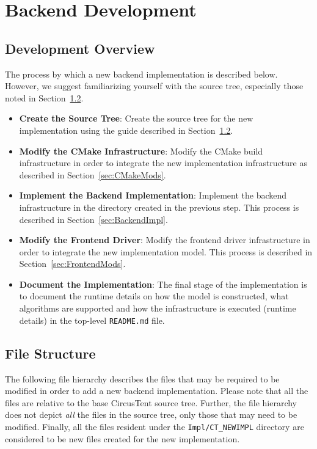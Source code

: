 \documentclass{article}
\begin{document}
\section{Backend Development}
\label{sec:BackendDev}

\subsection{Development Overview}
\label{sec:DevelopmentOverview}

The process by which a new backend implementation is described below.  However, 
we suggest familiarizing yourself with the source tree, especially those noted in 
Section~\ref{sec:FileStructure}.  

\begin{itemize}
\item \textbf{Create the Source Tree}: Create the source tree for the new implementation 
using the guide described in Section~\ref{sec:FileStructure}.  

\item \textbf{Modify the CMake Infrastructure}: Modify the CMake build infrastructure 
in order to integrate the new implementation infrastructure as described in Section~\ref{sec:CMakeMods}.  

\item \textbf{Implement the Backend Implementation}: Implement the backend infrastructure 
in the directory created in the previous step.  This process is described in Section~\ref{sec:BackendImpl}.  

\item \textbf{Modify the Frontend Driver}:  Modify the frontend driver infrastructure in order to 
integrate the new implementation model.  This process is described in Section~\ref{sec:FrontendMods}.  

\item \textbf{Document the Implementation}: The final stage of the implementation is to document the 
runtime details on how the model is constructed, what algorithms are supported and how the infrastructure 
is executed (runtime details) in the top-level \texttt{README.md} file.   
\end{itemize}

\clearpage
\subsection{File Structure}
\label{sec:FileStructure}

The following file hierarchy describes the files that may be required to be modified 
in order to add a new backend implementation.  Please note that all the files are 
relative to the base CircusTent source tree.  Further, the file hierarchy does not 
depict \textit{all} the files in the source tree, only those that may need to be modified.  
Finally, all the files resident under the \texttt{Impl/CT\_NEWIMPL} directory are considered 
to be new files created for the new implementation.  
\end{document}
